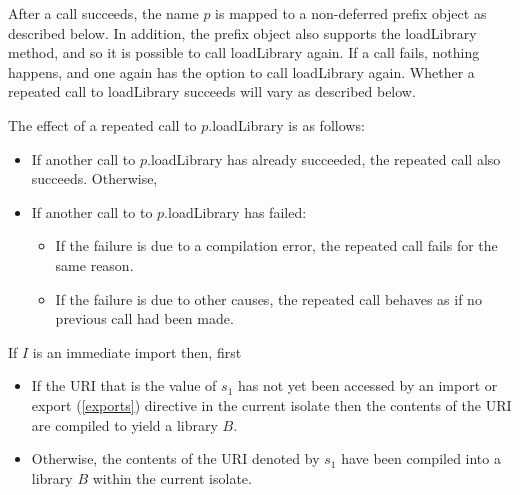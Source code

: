 \documentclass{article}
\newcommand{\code}[1]{{\sf #1}}
\begin{document}
\LMHash{}
After a call succeeds, the name $p$ is mapped to a non-deferred prefix object as described below. In addition, the prefix object also supports the \code{loadLibrary} method, and so it is possible to call \code{loadLibrary} again. If a call fails, nothing happens, and one again has the option to call \code{loadLibrary} again. Whether a repeated call to \code{loadLibrary} succeeds will vary as described below.

\LMHash{}
The effect of a repeated call to \code{$p$.loadLibrary} is as follows:
\begin{itemize}
\item
If another call to \code{$p$.loadLibrary} has already succeeded, the repeated call also succeeds. 
Otherwise,
\item
If another call to  to \code{$p$.loadLibrary} has failed:
\begin{itemize}
\item
If the failure is due to a compilation error, the repeated call fails for the same reason.
\item
If the failure is due to other causes, the repeated call behaves as if no previous call had been made.
\end{itemize}
\end{itemize}


\LMHash{}
If $I$ is an immediate import then, first

 \begin{itemize}
 \item
If  the URI that is the value of $s_1$ has not yet been accessed by an import or export (\ref{exports}) directive  in the current isolate then the contents of the URI  are compiled to yield a library $B$. 
\item Otherwise, the contents of the URI denoted by $s_1$ have been compiled into a library $B$ within the current isolate.
\end{itemize}
\end{document}
